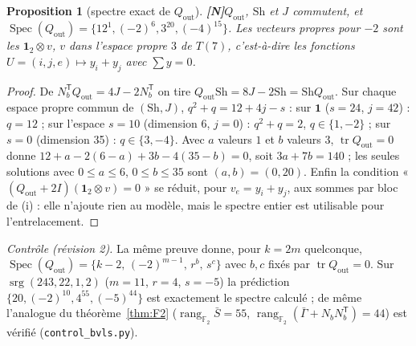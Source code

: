 \documentclass[11pt,a4paper]{article}
\newtheorem{proposition}[theorem]{Proposition}
\theoremstyle{definition}
\theoremstyle{remark}
\newcommand{\F}{\mathbb{F}}
\newcommand{\rg}{\operatorname{rang}}
\newcommand{\tr}{\operatorname{tr}}
\newcommand{\srg}{\operatorname{srg}}
\newcommand{\Spec}{\operatorname{Spec}}
\newcommand{\Sh}{\mathrm{Sh}}
\newcommand{\Qout}{Q_{\mathrm{out}}}
\newcommand{\st}[1]{\textbf{[#1]}}
\newcommand{\code}[1]{\texttt{#1}}
\begin{document}
\begin{proposition}[spectre exact de $\Qout$] \st{N}\label{prop:specQout}
$\Qout$, $\Sh$ et $J$ commutent, et $\Spec(\Qout)=\{12^1,(-2)^6,3^{20},(-4)^{15}\}$. Les vecteurs propres pour $-2$ sont les $\mathbf 1_2\otimes v$, $v$ dans l'espace propre $3$ de $T(7)$, c'est-à-dire les fonctions $U=(i,j,e)\mapsto y_i+y_j$ avec $\sum y=0$.
\end{proposition}
\begin{proof}
De $N_b^{\mathsf T}\Qout=4J-2N_b^{\mathsf T}$ on tire $\Qout\Sh=8J-2\Sh=\Sh\Qout$. Sur chaque espace propre commun de $(\Sh,J)$, $q^2+q=12+4j-s$ :
sur $\mathbf 1$ ($s=24$, $j=42$) : $q=12$ ; sur l'espace $s=10$ (dimension 6, $j=0$) : $q^2+q=2$, $q\in\{1,-2\}$ ; sur $s=0$ (dimension 35) : $q\in\{3,-4\}$.
Avec $a$ valeurs $1$ et $b$ valeurs $3$, $\tr\Qout=0$ donne $12+a-2(6-a)+3b-4(35-b)=0$, soit $3a+7b=140$ ; les seules solutions avec $0\le a\le6$, $0\le b\le35$ sont $(a,b)=(0,20)$.
Enfin la condition « $(\Qout+2I)(\mathbf 1_2\otimes v)=0$ » se réduit, pour $v_e=y_i+y_j$, aux sommes par bloc de (i) : elle n'ajoute rien au modèle, mais le spectre entier est utilisable pour l'entrelacement.
\end{proof}
\noindent\emph{Contrôle (révision 2).} La même preuve donne, pour $k=2m$ quelconque, $\Spec(\Qout)=\{k-2,\,(-2)^{m-1},\,r^{b},\,s^{c}\}$ avec $b,c$ fixés par $\tr\Qout=0$.
Sur $\srg(243,22,1,2)$ ($m=11$, $r=4$, $s=-5$) la prédiction $\{20,(-2)^{10},4^{55},(-5)^{44}\}$ est exactement le spectre calculé ; de même l'analogue du
théorème~\ref{thm:F2} ($\rg_{\F_2}\bar S=55$, $\rg_{\F_2}(\bar\Gamma+N_bN_b^{\mathsf T})=44$) est vérifié (\code{control\_bvls.py}).
\end{document}
